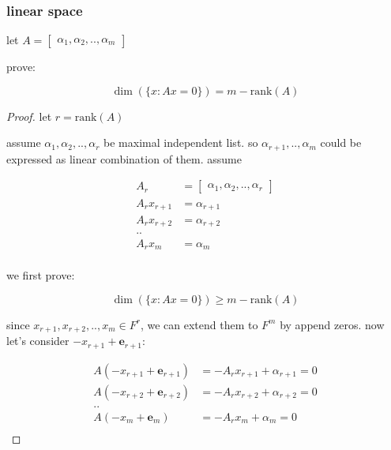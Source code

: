 \subsubsection{linear space}

\begin{exercise}
    let $A = \begin{bmatrix}
        \alpha_1,\alpha_2, ..,\alpha_m
    \end{bmatrix}$

    prove: 

    \[
        \dim(\{ x: Ax = 0\}) = m - \mathrm{rank}(A)
    \]
\end{exercise}

\begin{proof}
    let $r = \mathrm{rank}(A)$

    assume $\alpha_1, \alpha_2, .., \alpha_r$ be maximal independent list. so $\alpha_{r+1}, .., \alpha_{m}$ 
    could be expressed as linear combination of them. assume

    \begin{align*}
        A_r &= \begin{bmatrix}
            \alpha_1, \alpha_2, .., \alpha_r
        \end{bmatrix} \\
        A_rx_{r+1} &= \alpha_{r+1} \\
        A_rx_{r+2} &= \alpha_{r+2} \\
        .. \\
        A_rx_{m} &= \alpha_{m} \\
    \end{align*}


    we first prove:

    \[
        \dim(\{ x: Ax = 0\}) \ge m - \mathrm{rank}(A)
    \]

    since $x_{r+1},  x_{r+2} , .., x_{m} \in F^r$, we can extend them to $F^m$ by append zeros.
    now let's consider $-x_{r+1} + \mathbf{e}_{r+1}$:

    \begin{align*}
        A(-x_{r+1} + \mathbf{e}_{r+1}) &= -A_rx_{r+1} + \alpha_{r+1} = 0\\
        A(-x_{r+2} + \mathbf{e}_{r+2}) &= -A_rx_{r+2} + \alpha_{r+2} = 0\\
        .. \\
        A(-x_{m} + \mathbf{e}_{m}) &= -A_rx_{m} + \alpha_{m} = 0\\
    \end{align*}


\end{proof}
